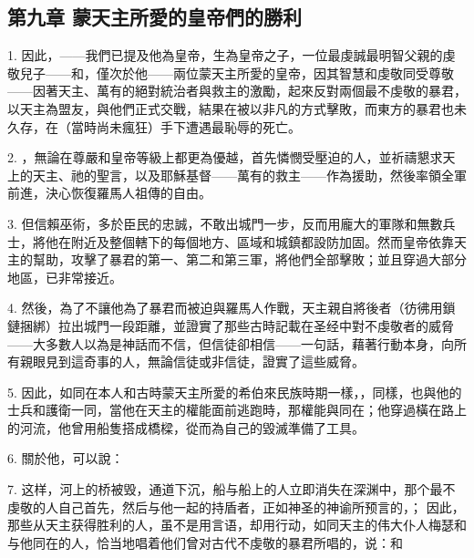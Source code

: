 
\subsection{第九章 蒙天主所愛的皇帝們的勝利}

1. 因此，——我們已提及他為皇帝，生為皇帝之子，一位最虔誠最明智父親的虔敬兒子——和，僅次於他——兩位蒙天主所愛的皇帝，因其智慧和虔敬同受尊敬——因著天主、萬有的絕對統治者與救主的激勵，起來反對兩個最不虔敬的暴君，以天主為盟友，與他們正式交戰，結果在被以非凡的方式擊敗，而東方的暴君也未久存，在（當時尚未瘋狂）手下遭遇最恥辱的死亡。\par

2. ，無論在尊嚴和皇帝等級上都更為優越，首先憐憫受壓迫的人，並祈禱懇求天上的天主、祂的聖言，以及耶穌基督——萬有的救主——作為援助，然後率領全軍前進，決心恢復羅馬人祖傳的自由。\par

3. 但信賴巫術，多於臣民的忠誠，不敢出城門一步，反而用龐大的軍隊和無數兵士，將他在附近及整個轄下的每個地方、區域和城鎮都設防加固。然而皇帝依靠天主的幫助，攻擊了暴君的第一、第二和第三軍，將他們全部擊敗；並且穿過大部分地區，已非常接近。\par

4. 然後，為了不讓他為了暴君而被迫與羅馬人作戰，天主親自將後者（彷彿用鎖鏈捆綁）拉出城門一段距離，並證實了那些古時記載在圣经中對不虔敬者的威脅——大多數人以為是神話而不信，但信徒卻相信——一句話，藉著行動本身，向所有親眼見到這奇事的人，無論信徒或非信徒，證實了這些威脅。\par

5. 因此，如同在本人和古時蒙天主所愛的希伯來民族時期一樣，，同樣，也與他的士兵和護衛一同，當他在天主的權能面前逃跑時，那權能與同在；他穿過橫在路上的河流，他曾用船隻搭成橋樑，從而為自己的毀滅準備了工具。\par

6. 關於他，可以說：\par

7. 这样，河上的桥被毁，通道下沉，船与船上的人立即消失在深渊中，那个最不虔敬的人自己首先，然后与他一起的持盾者，正如神圣的神谕所预言的，； 因此，那些从天主获得胜利的人，虽不是用言语，却用行动，如同天主的伟大仆人梅瑟和与他同在的人，恰当地唱着他们曾对古代不虔敬的暴君所唱的，说：和\par

